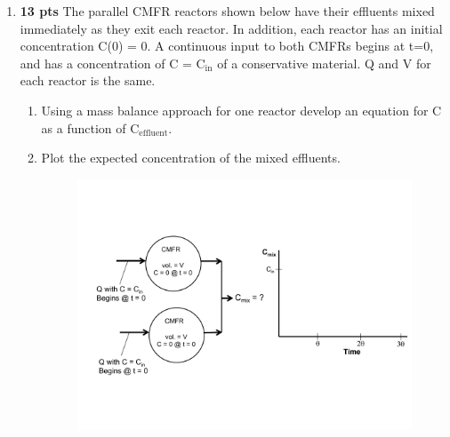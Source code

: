 \documentclass[12pt,letterpaper]{article}
\begin{document}
\begin{enumerate}
\pagebreak

\item \textbf{13 pts} The parallel CMFR reactors shown below have their effluents mixed immediately as they exit each reactor. In addition, each reactor has an initial concentration C(0) = 0.  A continuous input to both CMFRs begins at t=0, and has a concentration of C = C$\mathrm{_{in}}$ of a conservative material.  Q and V for each reactor is the same.
\begin{enumerate}
\item Using a mass balance approach for one reactor develop an equation for C as a function of C$\mathrm{_{effluent}}$.
\vspace{3in}

\item Plot the expected concentration of the mixed effluents. 

\begin{figure}
\centering
\includegraphics[width=1\textwidth]{two_cmfr}
\end{figure}

\end{enumerate}











\end{enumerate}
\end{document}
